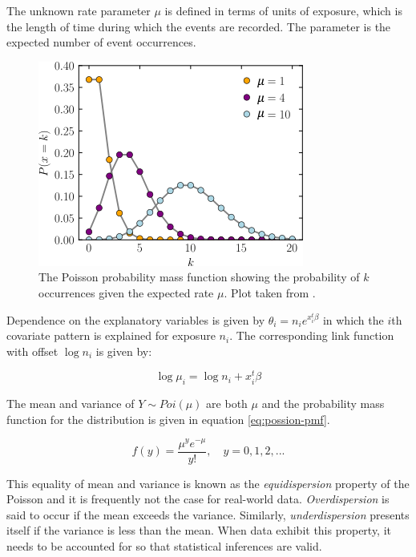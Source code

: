 \documentclass{thesis}
\begin{document}
The unknown rate parameter $\mu$ is defined in terms of units of exposure, which is the length of time during which the events are recorded\cite{cameron_trivedi_2013}. The parameter is the expected number of event occurrences.

\begin{figure}[h]
    \centering
    \includegraphics[scale=0.8]{images/poisson-pmf.png}
    \caption{The Poisson probability mass function showing the probability of $k$ occurrences given the expected rate $\mu$. Plot taken from \cite{poisson-wikipedia}.}
    \label{fig:poisson-pmf}
\end{figure}

Dependence on the explanatory variables is given by $\theta_i = n_ie^{x_i^t\beta}$ in which the $i$th covariate pattern is explained for exposure $n_i$. The corresponding link function with offset $\log{n_i}$ is given by:

\begin{equation}
    \log{\mu_i} = \log{n_i} + x_i^t\beta
\end{equation}

The mean and variance of $Y \sim Poi(\mu)$ are both $\mu$ and the probability mass function for the distribution is given in equation \ref{eq:possion-pmf}. 

\begin{equation}
f(y) = \frac{\mu^ye^{-\mu}}{y!},\hspace{1em}y = 0, 1, 2,...
\label{eq:possion-pmf}
\end{equation}

This equality of mean and variance is known as the \textit{equidispersion} property of the Poisson and it is frequently not the case for real-world data. \textit{Overdispersion} is said to occur if the mean exceeds the variance. Similarly, \textit{underdispersion} presents itself if the variance is less than the mean. When data exhibit this property, it needs to be accounted for so that statistical inferences are valid\cite{understanding-poisson}.
\end{document}
